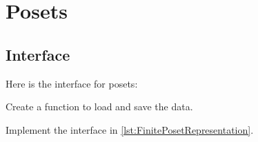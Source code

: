 
\section{\usebox{\chaptergear} Posets}

\begin{figure}

    \caption{}
    \label{fig:poset-finiteposet}
\end{figure}

\subsection*{Interface}

Here is the interface for posets:


%



\begin{codeexercise}
    Create a function to load and save the data.

    Implement the interface in \cref{lst:FinitePosetRepresentation}.
\end{codeexercise}


